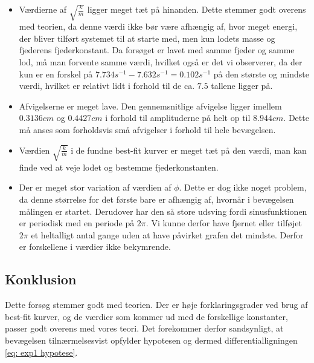 \begin{itemize}

\item Værdierne af $\sqrt{\frac{k}{m}}$ ligger meget tæt på hinanden. 
Dette stemmer godt overens med teorien, da denne værdi ikke bør være afhængig af, hvor meget energi, der bliver tilført systemet til at starte med, men kun lodets masse og fjederens fjederkonstant. 
Da forsøget er lavet med samme fjeder og samme lod, må man forvente samme værdi, hvilket også er det vi observerer, da der kun er en forskel på $7.734s^{-1}-7.632s^{-1}=0.102s^{-1}$ på den største og mindste værdi, hvilket er relativt lidt i forhold til de ca. $7.5$ tallene ligger på.



\item Afvigelserne er meget lave. 
Den gennemsnitlige afvigelse ligger imellem $0.3136cm$ og $0.4427cm$ i forhold til amplituderne på helt op til $8.944cm$. 
Dette må anses som forholdsvis små afvigelser i forhold til hele bevægelsen.



\item Værdien $\sqrt{\frac{k}{m}}$ i de fundne best-fit kurver er meget tæt på den værdi, man kan finde ved at veje lodet og bestemme fjederkonstanten.



\item Der er meget stor variation af værdien af $\phi$.
Dette er dog ikke noget problem, da denne størrelse for det første bare er afhængig af, hvornår i bevægelsen målingen er startet.
Derudover har den så store udsving fordi sinusfunktionen er periodisk med en periode på $2\pi$.
Vi kunne derfor have fjernet eller tilføjet $2\pi$ et heltalligt antal gange uden at have påvirket grafen det mindste. 
Derfor er forskellene i værdier ikke bekymrende. 


\end{itemize}

\subsection{Konklusion}
Dette forsøg stemmer godt med teorien. 
Der er høje forklaringsgrader ved brug af best-fit kurver, og de værdier som kommer ud med de forskellige konstanter, passer godt overens med vores teori.
Det forekommer derfor sandsynligt, at bevægelsen tilnærmelsesvist opfylder hypotesen og dermed differentialligningen \ref{eq: exp1 hypotese}.

